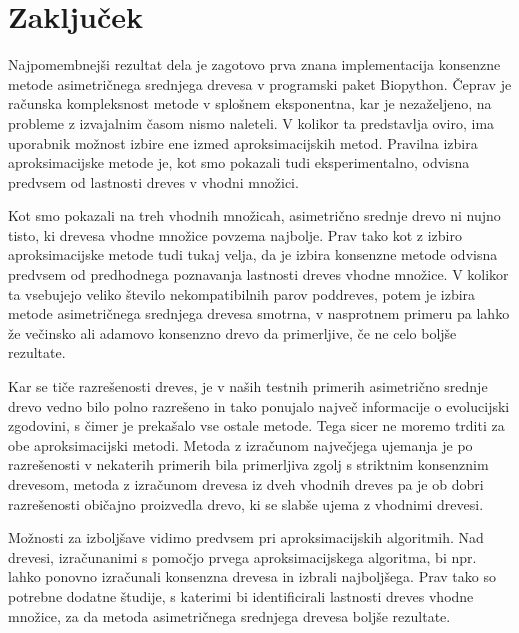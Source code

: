 \documentclass[a4paper, 12pt]{book}
\begin{document}
\chapter{Zaključek}
Najpomembnejši rezultat dela je zagotovo prva znana implementacija konsenzne metode asimetričnega srednjega drevesa v programski paket Biopython. Čeprav je računska kompleksnost metode v splošnem eksponentna, kar je nezaželjeno, na probleme z izvajalnim časom nismo naleteli. V kolikor ta predstavlja oviro, ima uporabnik možnost izbire ene izmed aproksimacijskih metod. Pravilna izbira aproksimacijske metode je, kot smo pokazali tudi eksperimentalno, odvisna predvsem od lastnosti dreves v vhodni množici. 

Kot smo pokazali na treh vhodnih množicah, asimetrično srednje drevo ni nujno tisto, ki drevesa vhodne množice povzema najbolje. Prav tako kot z izbiro aproksimacijske metode tudi tukaj velja, da je izbira konsenzne metode odvisna predvsem od predhodnega poznavanja lastnosti dreves vhodne množice. V kolikor ta vsebujejo veliko število nekompatibilnih parov poddreves, potem je izbira metode asimetričnega srednjega drevesa smotrna, v nasprotnem primeru pa lahko že večinsko ali adamovo konsenzno drevo da primerljive, če ne celo boljše rezultate.

Kar se tiče razrešenosti dreves, je v naših testnih primerih asimetrično srednje drevo vedno bilo polno razrešeno in tako ponujalo največ informacije o evolucijski zgodovini, s čimer je prekašalo vse ostale metode. Tega sicer ne moremo trditi za obe aproksimacijski metodi. Metoda z izračunom največjega ujemanja je po razrešenosti v nekaterih primerih bila primerljiva zgolj s striktnim konsenznim drevesom, metoda z izračunom drevesa iz dveh vhodnih dreves pa je ob dobri razrešenosti običajno proizvedla drevo, ki se slabše ujema z vhodnimi drevesi.

Možnosti za izboljšave vidimo predvsem pri aproksimacijskih algoritmih. Nad drevesi, izračunanimi s pomočjo prvega aproksimacijskega algoritma, bi npr. lahko ponovno izračunali konsenzna drevesa in izbrali najboljšega. Prav tako so potrebne dodatne študije, s katerimi bi identificirali lastnosti dreves vhodne množice, za da metoda asimetričnega srednjega drevesa boljše rezultate.
\end{document}
